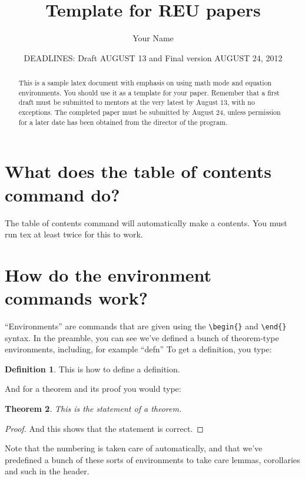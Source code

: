 \documentclass[psamsfonts]{amsart}
\title{Template for REU papers}
\author{Your Name}
\date{DEADLINES: Draft AUGUST 13 and Final version AUGUST 24, 2012}
\newtheorem{thm}{Theorem}[section]
\theoremstyle{definition}
\newtheorem{defn}[thm]{Definition}
\theoremstyle{remark}
\numberwithin{equation}{section}
\begin{document}
\begin{abstract}

This is a sample latex document with emphasis on using math mode and
equation environments.  You should use it as a template for your paper.
Remember that a first draft must be submitted to mentors at the very 
latest by August 13, with
no exceptions.  The completed paper must be submitted by August 24, unless 
permission for a later date has been obtained from the director of the program. 


\end{abstract}

\maketitle

\tableofcontents

\section{What does the table of contents command do?}

The table of contents command will automatically make a contents.
You must run tex at least twice for this to work.

\section{How do the environment commands work?}

``Environments'' are commands that are given using the \verb|\begin{}|
  and \verb|\end{}| syntax. In the preamble, you can see we've defined
  a bunch of theorem-type environments, including, for example ``defn'' To get a definition, 
you type:

\begin{defn}  This is how to define a definition.
\end{defn}

And for a theorem and its proof you would type:

\begin{thm}
This is the statement of a theorem.
\end{thm}
\begin{proof}
And this shows that the statement is correct.
\end{proof}

Note that the numbering is taken care of automatically, and that we've predefined a bunch of these sorts of environments to take care lemmas, corollaries and such in the header. 
\end{document}
